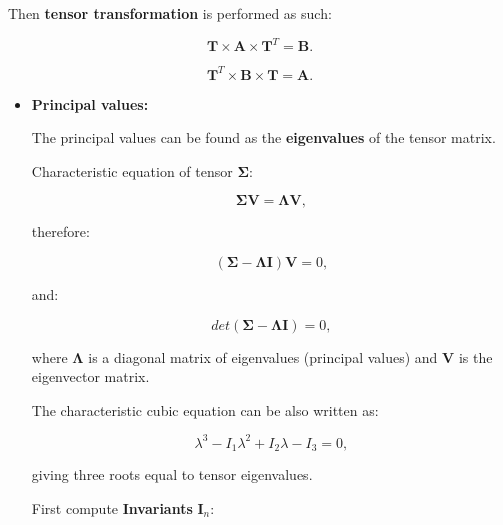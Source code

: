 Then \textbf{tensor transformation} is performed as such:

\begin{equation}
    \mathbf{T} \times \mathbf{A} \times \mathbf{T}^{T} = \mathbf{B}
.\end{equation}

\begin{equation}
    \mathbf{T}^{T} \times \mathbf{B} \times \mathbf{T} = \mathbf{A}
.\end{equation}

\begin{itemize}
    \item \textbf{Principal values:}

        The principal values can be found as the \textbf{eigenvalues} of the tensor
        matrix.

        Characteristic equation of tensor $\mathbf{\Sigma}$:

        \begin{equation}
            \mathbf{\Sigma}\mathbf{V} = \mathbf{\Lambda} \mathbf{V}
        ,\end{equation}

        therefore:

        \begin{equation}
            (\mathbf{\Sigma} - \mathbf{\Lambda}\mathbf{I})\mathbf{V} = 0
        ,\end{equation}

        and:

        \begin{equation}
            det(\mathbf{\Sigma} - \mathbf{\Lambda}\mathbf{I}) = 0
        ,\end{equation}

        where $\mathbf{\Lambda}$ is a diagonal matrix of eigenvalues (principal values)
        and $\mathbf{V}$ is the eigenvector matrix.

        The characteristic cubic equation can be also written as:

        \begin{equation}
            \lambda^{3} - I_{1}\lambda^{2} + I_{2}\lambda - I_{3} = 0
            \label{eqn:cubic_cardano}
        ,\end{equation}

        giving three roots equal to tensor eigenvalues.

        First compute \textbf{Invariants} $\mathbf{I}_{n}$:


\end{itemize}
